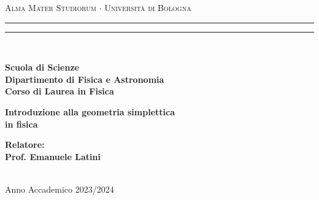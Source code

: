 \begin{titlepage}
  \begin{center}
  {{\Large{\textsc{Alma Mater Studiorum $\cdot$ Università di Bologna}}}} 
  \rule[0.1cm]{\textwidth}{0.1mm}
  \rule[0.5cm]{\textwidth}{0.6mm}
  \\\vspace{3mm}
  
  {\small{\bf Scuola di Scienze \\ 
  Dipartimento di Fisica e Astronomia\\
  Corso di Laurea in Fisica}}
  
  \end{center}
  
  \vspace{23mm}
  
  \begin{center}{
  {\LARGE{\bf Introduzione alla geometria simplettica \\in fisica}}\\
  }\end{center}
  
  \vspace{50mm} \par \noindent
  
  \begin{minipage}[t]{0.47\textwidth}
  {\large{\bf Relatore: \vspace{2mm}\\{
  Prof. Emanuele Latini}}}\\\\

  \end{minipage}
  \hfill
  \begin{minipage}[t]{0.47\textwidth}
  \end{minipage}
  
  \vspace{40mm}
  
  \begin{center}
  Anno Accademico {2023/2024}
  \end{center}
  
  \end{titlepage} 